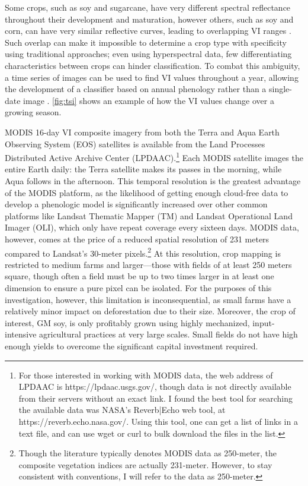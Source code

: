 Some crops, such as soy and sugarcane, have very different spectral reflectance throughout their development and maturation, however others, such as soy and corn, can have very similar reflective curves, leading to overlapping VI ranges \autocite{price1994how-unique}. Such overlap can make it impossible to determine a crop type with specificity using traditional approaches; even using hyperspectral data, few differentiating characteristics between crops can hinder classification. To combat this ambiguity, a time series of images can be used to find VI values throughout a year, allowing the development of a classifier based on annual phenology rather than a single-date image \autocites{gu2010phenological}{wardlow2002discriminating}{wardlow2005state-level}{wardlow2007analysis}{wardlow2008large-area}{zhang2003monitoring}. \autoref{fig:tsi} shows an example of how the VI values change over a growing season.
	
MODIS 16-day VI composite imagery from both the Terra and Aqua Earth Observing System (EOS) satellites is available from the Land Processes Distributed Active Archive Center (LPDAAC).\footnote{For those interested in working with MODIS data, the web address of LPDAAC is https://lpdaac.usgs.gov/, though data is not directly available from their servers without an exact link. I found the best tool for searching the available data was NASA’s Reverb|Echo web tool, at https://reverb.echo.nasa.gov/. Using this tool, one can get a list of links in a text file, and can use wget or curl to bulk download the files in the list.} Each MODIS satellite images the entire Earth daily: the Terra satellite makes its passes in the morning, while Aqua follows in the afternoon. This temporal resolution is the greatest advantage of the MODIS platform, as the likelihood of getting enough cloud-free data to develop a phenologic model is significantly increased over other common platforms like Landsat Thematic Mapper (TM) and Landsat Operational Land Imager (OLI), which only have repeat coverage every sixteen days. MODIS data, however, comes at the price of a reduced spatial resolution of 231 meters compared to Landsat’s 30-meter pixels.\footnote{Though the literature typically denotes MODIS data as 250-meter, the composite vegetation indices are actually 231-meter. However, to stay consistent with conventions, I will refer to the data as 250-meter.} At this resolution, crop mapping is restricted to medium farms and larger---those with fields of at least 250 meters square, though often a field must be up to two times larger in at least one dimension to ensure a pure pixel can be isolated. For the purposes of this investigation, however, this limitation is inconsequential, as small farms have a relatively minor impact on deforestation due to their size. Moreover, the crop of interest, GM soy, is only profitably grown using highly mechanized, input-intensive agricultural practices at very large scales. Small fields do not have high enough yields to overcome the significant capital investment required. \todo[inline]{NEED A SOURCE FOR THIS---TALK TO POLO]}

